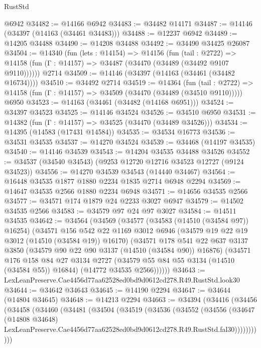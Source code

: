 \begin{lexlean}{RustStd}
\begin{coremodule}
    @6942
@34482 := @14166 @6942
@34483 := @34482 @14171
@34487 := @14146 (@34397 (@14163 (@34461 @34483)))
@34488 := @12237 @6942
@34489 := @14205 @34488
@34490 := @14208 @34488
@34492 := @34490 @34425 @26087
@34504 := @14340
    (fun (lets : @14154) =>
    @14156
      (fun (tail : @2722) =>
      @14158 (fun (Γ : @14157) => @34487 (@34470 (@34489 (@34492 @9107 @9110))))))
    @2714
@34509 := @14146 (@34397 (@14163 (@34461 (@34482 @16734))))
@34510 := @34492 @2714
@34519 := @14364
    (fun (tail : @2722) => @14158 (fun (Γ : @14157) => @34509 (@34470 (@34489 (@34510 @9110)))))
    @6950
@34523 := @14163 (@34461 (@34482 (@14168 @6951)))
@34524 := @34397 @34523
@34525 := @14146 @34524
@34526 := @34510 @6950
@34531 := @14382 (fun (Γ : @14157) => @34525 (@34470 (@34489 @34526)))
@34534 := @14395 (@14583 (@17431 @14584))
@34535 := @34534 @16773
@34536 := @34531 @34535
@34537 := @14270 @34524
@34539 := @34468 (@14197 @34535)
@34540 := @14146 @34539
@34543 := @14204 @34535 @34488 @34526
@34552 := @34537 (@34540 @34543) (@9253 @12720 @12716 @34523 @12727 (@9124 @34523))
@34556 := @14270 @34539 @34543 (@14440 @34467)
@34564 := @16448 @34535 @1877 @1880 @2234 @1835 @2714 @6948 @2294
@34569 := @14647 @34535 @2566 @1880 @2234 @6948
@34571 := @14656 @34535 @2566
@34577 := @34571 @174 @1879 @24 @2233 @3027 @6947
@34579 := @14502 @34535 @2566
@34583 := @34579 @97 @24 @97 @3027
@34584 := @14511 @34535
@34642 := @34564
    (@34569
      (@34577
        (@34583 (@14510 (@34584 @97)) @16254)
        (@34571
          @156
          @542
          @22
          @1169
          @3012
          @6946
          (@34579 @19 @22 @19 @3012 (@14510 (@34584 @19)) @16170)
          (@34571
            @178
            @541
            @22
            @637
            @3137
            @3850
            (@34579 @90 @22 @90 @3137 (@14510 (@34584 @90)) @16876)
            (@34571
              @176
              @158
              @84
              @27
              @3134
              @2727
              (@34579 @55 @84 @55 @3134 (@14510 (@34584 @55)) @16844)
              (@14772 @34535 @2566))))))
@34643 := LexLeanPreserve.Cae4456d77aa62528ed0bd9d0612cd278.R49.RustStd.look30
@34644 := @34642 @34643
@34645 := @14190 @2294
@34647 := @34644 (@14804 @34645)
@34648 := @14213 @2294
@34663 := @34394
    (@34416
      (@34456
        (@34458
          (@34460
            (@34481
              (@34504
                (@34519
                  (@34536
                    (@34552
                      (@34556
                        (@34647
                          (@14808 @34648)
                          LexLeanPreserve.Cae4456d77aa62528ed0bd9d0612cd278.R49.RustStd.fal30)))))))))))

\end{coremodule}
\end{lexlean}
